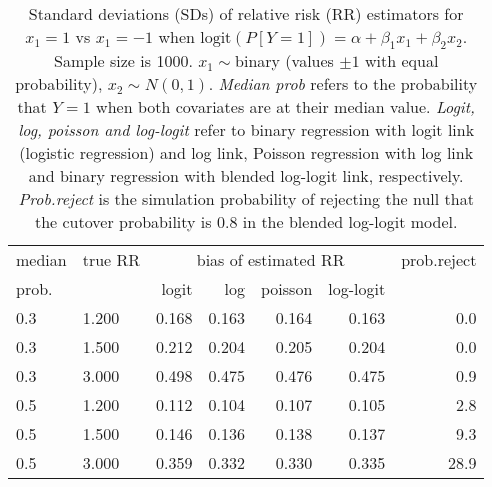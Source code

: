 \documentclass[12pt,a4paper]{article}
\begin{document}
\begin{table}[H] 
\small\sf\centering 
\caption{Standard deviations (SDs) of relative risk (RR) estimators for $x_1=1$ vs $x_1=-1$ when $\mbox{logit}(P[Y=1])=\alpha+\beta_1 x_1 + \beta_2 x_2$. Sample size is 1000. $x_1 \sim $binary (values $\pm 1$ with equal probability), $x_2 \sim N(0,1)$. {\it Median prob} refers to the probability that $Y=1$ when both covariates are at their median value. {\it Logit, log, poisson and log-logit} refer to binary regression with logit link (logistic regression) and log link, Poisson regression with log link and binary regression with blended log-logit link, respectively. {\it Prob.reject} is the simulation probability of rejecting the null that the cutover probability is $0.8$ in the blended log-logit model.} 
\begin{tabular}{llrrrrr} 
\toprule 
median & true RR & \multicolumn{4}{c}{bias of estimated RR} & prob.reject \\ 
prob. & & logit & log & poisson & log-logit  & \\ \midrule 
0.3 & 1.200 & 0.168 & 0.163 & 0.164 & 0.163 &  0.0 \\  
0.3 & 1.500 & 0.212 & 0.204 & 0.205 & 0.204 &  0.0 \\  
0.3 & 3.000 & 0.498 & 0.475 & 0.476 & 0.475 &  0.9 \\  
0.5 & 1.200 & 0.112 & 0.104 & 0.107 & 0.105 &  2.8 \\  
0.5 & 1.500 & 0.146 & 0.136 & 0.138 & 0.137 &  9.3 \\  
0.5 & 3.000 & 0.359 & 0.332 & 0.330 & 0.335 & 28.9 \\  
\bottomrule 
\end{tabular} 
\end{table} 
\end{document}
